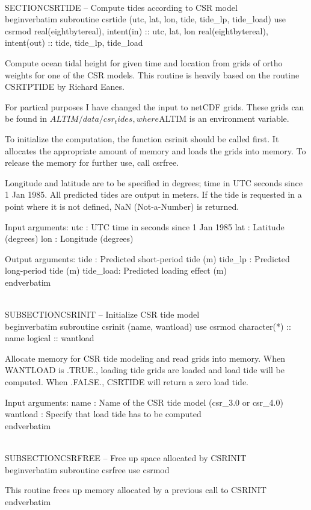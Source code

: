 \\SECTION{CSRTIDE -- Compute tides according to CSR model}
\\begin{verbatim}
subroutine csrtide (utc, lat, lon, tide, tide_lp, tide_load)
use csrmod
real(eightbytereal), intent(in) :: utc, lat, lon
real(eightbytereal), intent(out) :: tide, tide_lp, tide_load

Compute ocean tidal height for given time and location from grids
of ortho weights for one of the CSR models.
This routine is heavily based on the routine CSRTPTIDE by Richard Eanes.

For partical purposes I have changed the input to netCDF grids.
These grids can be found in $ALTIM/data/csr_tides, where $ALTIM is an
environment variable.

To initialize the computation, the function csrinit should be
called first. It allocates the appropriate amount of memory and
loads the grids into memory. To release the memory for further
use, call csrfree.

Longitude and latitude are to be specified in degrees; time in UTC
seconds since 1 Jan 1985. All predicted tides are output in meters.
If the tide is requested in a point where it is not defined, NaN
(Not-a-Number) is returned.

Input arguments:
 utc      : UTC time in seconds since 1 Jan 1985
 lat      : Latitude (degrees)
 lon      : Longitude (degrees)

Output arguments:
 tide     : Predicted short-period tide (m)
 tide_lp  : Predicted long-period tide (m)
 tide_load: Predicted loading effect (m)
\\end{verbatim}

\\SUBSECTION{CSRINIT -- Initialize CSR tide model}
\\begin{verbatim}
subroutine csrinit (name, wantload)
use csrmod
character(*) :: name
logical :: wantload

Allocate memory for CSR tide modeling and read grids into memory.
When WANTLOAD is .TRUE., loading tide grids are loaded and load tide
will be computed. When .FALSE., CSRTIDE will return a zero load tide.

Input arguments:
 name     : Name of the CSR tide model (csr_3.0 or csr_4.0)
 wantload : Specify that load tide has to be computed
\\end{verbatim}

\\SUBSECTION{CSRFREE -- Free up space allocated by CSRINIT}
\\begin{verbatim}
subroutine csrfree
use csrmod

This routine frees up memory allocated by a previous call to CSRINIT
\\end{verbatim}

